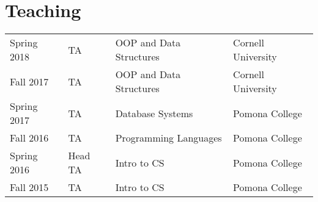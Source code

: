 \documentclass[]{deedy-resume-openfont}
\begin{document}
\begin{minipage}[t]{0.66\textwidth}




\section{Teaching} 

\begin{tabular}{llll}
  
    Spring 2018 & TA & OOP and Data Structures & Cornell University \\
  
    Fall 2017 & TA & OOP and Data Structures & Cornell University \\
  
    Spring 2017 & TA & Database Systems & Pomona College \\
  
    Fall 2016 & TA & Programming Languages & Pomona College \\
  
    Spring 2016 & Head TA & Intro to CS & Pomona College \\
  
    Fall 2015 & TA & Intro to CS & Pomona College \\
  
\end{tabular}


\sectionsep

\end{minipage} 
\end{document}
